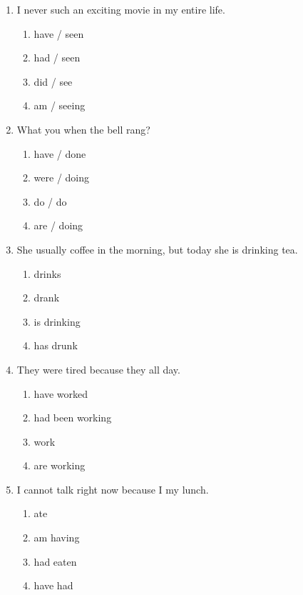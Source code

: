 \documentclass[11pt, a4paper]{article}
\begin{document}
\begin{enumerate}[leftmargin=1.8em, itemsep=10pt]
    \item I \dotfill never \dotfill such an exciting movie in my entire life.
    \begin{enumerate}[label=(\Alph*), itemsep=2pt]
        \item have / seen
        \item had / seen
        \item did / see
        \item am / seeing
    \end{enumerate}

    \item What \dotfill you \dotfill when the bell rang?
    \begin{enumerate}[label=(\Alph*), itemsep=2pt]
        \item have / done
        \item were / doing
        \item do / do
        \item are / doing
    \end{enumerate}

    \item She usually \dotfill coffee in the morning, but today she is drinking tea.
    \begin{enumerate}[label=(\Alph*), itemsep=2pt]
        \item drinks
        \item drank
        \item is drinking
        \item has drunk
    \end{enumerate}

    \item They were tired because they \dotfill all day.
    \begin{enumerate}[label=(\Alph*), itemsep=2pt]
        \item have worked
        \item had been working
        \item work
        \item are working
    \end{enumerate}

    \item I cannot talk right now because I \dotfill my lunch.
    \begin{enumerate}[label=(\Alph*), itemsep=2pt]
        \item ate
        \item am having
        \item had eaten
        \item have had
    \end{enumerate}


\end{enumerate}
\end{document}
